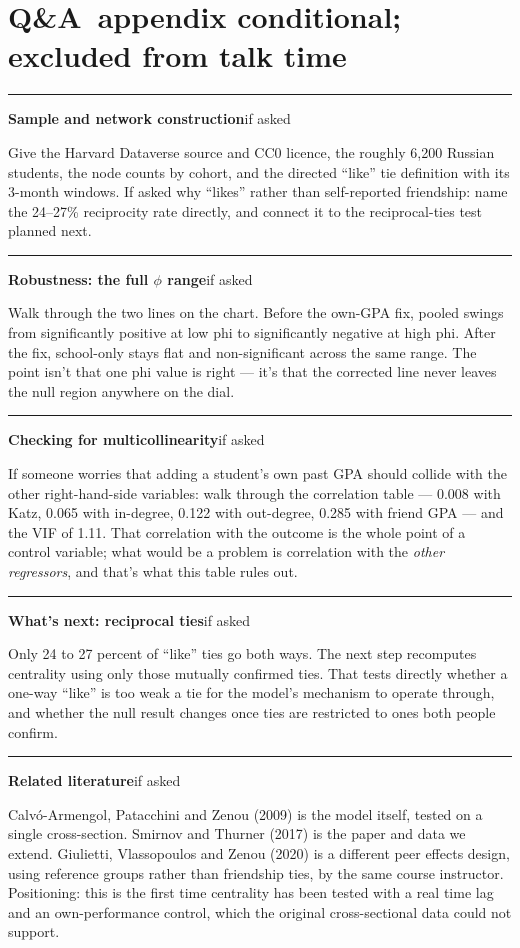 \documentclass[11pt]{article}
\newcommand{\scriptframe}[3]{%
  \Needspace{9\baselineskip}%
  \par\medskip\noindent\textcolor{ScriptBlue}{\rule{\linewidth}{0.55pt}}%
  \par\smallskip\noindent
  \textbf{#1}\hfill\textcolor{ScriptGray}{\small #2}\par\smallskip
  #3\par}
\newcommand{\ScriptAppendix}{%
  \clearpage
  \section*{\mbox{Q\&A appendix} \hfill
    \normalfont\small\textcolor{ScriptGray}{conditional; excluded from talk time}}}
\begin{document}
\ScriptAppendix

\scriptframe{Sample and network construction}{if asked}{%
  Give the Harvard Dataverse source and CC0 licence, the roughly 6,200
  Russian students, the node counts by cohort, and the directed ``like'' tie
  definition with its 3-month windows. If asked why ``likes'' rather than
  self-reported friendship: name the 24--27\% reciprocity rate directly, and
  connect it to the reciprocal-ties test planned next.
}

\scriptframe{Robustness: the full \(\phi\) range}{if asked}{%
  Walk through the two lines on the chart. Before the own-GPA fix, pooled
  swings from significantly positive at low phi to significantly negative at
  high phi. After the fix, school-only stays flat and non-significant across
  the same range. The point isn't that one phi value is right --- it's that
  the corrected line never leaves the null region anywhere on the dial.
}

\scriptframe{Checking for multicollinearity}{if asked}{%
  If someone worries that adding a student's own past GPA should collide
  with the other right-hand-side variables: walk through the correlation
  table --- 0.008 with Katz, 0.065 with in-degree, 0.122 with out-degree,
  0.285 with friend GPA --- and the VIF of 1.11. That correlation with the
  outcome is the whole point of a control variable; what would be a problem
  is correlation with the \emph{other regressors}, and that's what this table
  rules out.
}

\scriptframe{What's next: reciprocal ties}{if asked}{%
  Only 24 to 27 percent of ``like'' ties go both ways. The next step
  recomputes centrality using only those mutually confirmed ties. That tests
  directly whether a one-way ``like'' is too weak a tie for the model's
  mechanism to operate through, and whether the null result changes once
  ties are restricted to ones both people confirm.
}

\scriptframe{Related literature}{if asked}{%
  Calv{\'o}-Armengol, Patacchini and Zenou (2009) is the model itself, tested
  on a single cross-section. Smirnov and Thurner (2017) is the paper and data
  we extend. Giulietti, Vlassopoulos and Zenou (2020) is a different peer
  effects design, using reference groups rather than friendship ties, by the
  same course instructor. Positioning: this is the first time centrality has
  been tested with a real time lag and an own-performance control, which the
  original cross-sectional data could not support.
}

\end{document}
